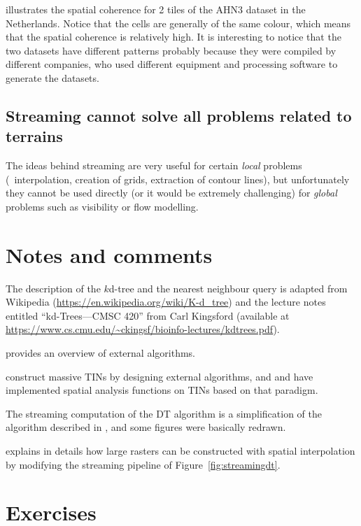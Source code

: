illustrates the spatial coherence for 2 tiles of the AHN3 dataset in the Netherlands.
Notice that the cells are generally of the same colour, which means that the spatial coherence is relatively high.
It is interesting to notice that the two datasets have different patterns probably because they were compiled by different companies, who used different equipment and processing software to generate the datasets.


\subsection{Streaming cannot solve all problems related to terrains}
The ideas behind streaming are very useful for certain \emph{local} problems (\eg\ interpolation, creation of grids, extraction of contour lines), but unfortunately they cannot be used directly (or it would be extremely challenging) for \emph{global} problems such as visibility or flow modelling.

%
\section{Notes and comments}

The description of the $k$d-tree and the nearest neighbour query is adapted from Wikipedia (\url{https://en.wikipedia.org/wiki/K-d_tree}) and the lecture notes entitled ``kd-Trees---CMSC 420'' from Carl Kingsford (available at \url{https://www.cs.cmu.edu/~ckingsf/bioinfo-lectures/kdtrees.pdf}).

\citet{Vitter01} provides an overview of external algorithms.

\citet{Agarwal05} construct massive TINs by designing external algorithms, and \citet{Arge06} and \citet{Agarwal08} have implemented spatial analysis functions on TINs based on that paradigm.

The streaming computation of the DT algorithm is a simplification of the algorithm described in \citet{Isenburg06}, and some figures were basically redrawn.

\citet{isenburg06-1} explains in details how large rasters can be constructed with spatial interpolation by modifying the streaming pipeline of Figure~\ref{fig:streamingdt}.


%
\section{Exercises}


